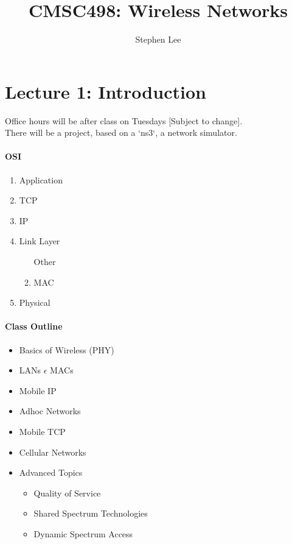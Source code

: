 \documentclass{article}
\author{Stephen Lee}
\title{CMSC498: Wireless Networks}
\begin{document}
\maketitle
\tableofcontents

\section{Lecture 1: Introduction}
Office hours will be after class on Tuesdays [Subject to change]. \\
There will be a project, based on a `ns3`, a network simulator.

\begin{multicols}{2}
\paragraph{OSI}
\begin{enumerate}
  \setlength\itemsep{0em}
  \item Application
  \item TCP
  \item IP
  \item Link Layer
    \begin{enumerate}
      \item [Other]
      \item MAC
    \end{enumerate}
  \item Physical
\end{enumerate}

\columnbreak

\paragraph{Class Outline}
\begin{itemize}
  \setlength\itemsep{0em}
  \item Basics of Wireless (PHY)
  \item LANs $\epsilon$ MACs
  \item Mobile IP
  \item Adhoc Networks
  \item Mobile TCP
  \item Cellular Networks
  \item Advanced Topics
    \begin{itemize}
      \item Quality of Service
      \item Shared Spectrum Technologies
      \item Dynamic Spectrum Access
    \end{itemize}
\end{itemize}

\end{multicols}
\end{document}

